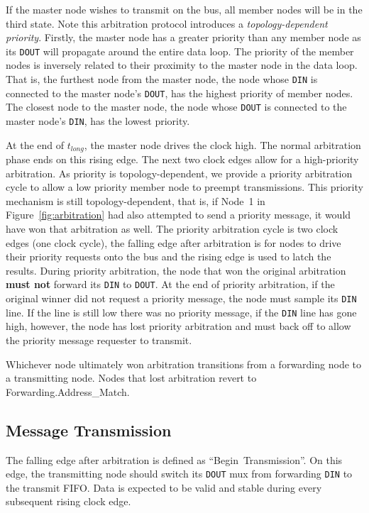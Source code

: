 If the master node wishes to transmit on the bus, all member nodes will be in
the third state. Note this arbitration protocol introduces a {\em
topology-dependent priority}. Firstly, the master node has a greater priority
than any member node as its {\tt DOUT} will propagate around the entire data
loop. The priority of the member nodes is inversely related to their proximity
to the master node in the data loop. That is, the furthest node from the
master node, the node whose {\tt DIN} is connected to the master node's
{\tt DOUT}, has the highest priority of member nodes. The closest node to the
master node, the node whose {\tt DOUT} is connected to the master node's
{\tt DIN}, has the lowest priority.

At the end of $t_{long}$, the master node drives the clock high. The
normal arbitration phase ends on this rising edge. The next two clock edges
allow for a high-priority arbitration. As \bus priority is topology-dependent,
we provide a priority arbitration cycle to allow a low priority member node to
preempt transmissions. This priority mechanism is still topology-dependent,
that is, if Node~1 in Figure~\ref{fig:arbitration} had also attempted to send
a priority message, it would have won that arbitration as well. The priority
arbitration cycle is two clock edges (one clock cycle), the falling edge after
arbitration is for nodes to drive their priority requests onto the bus and the
rising edge is used to latch the results.  During priority arbitration, the
node that won the original arbitration {\bf must not} forward its {\tt DIN} to
{\tt DOUT}. At the end of priority
arbitration, if the original winner did not request a priority message, the
node must sample its {\tt DIN} line. If the line is still low there was no
priority message, if the {\tt DIN} line has gone high, however, the node
has lost priority arbitration and must back off to allow the priority message
requester to transmit.

Whichever node ultimately won arbitration transitions from a forwarding node
to a transmitting node. Nodes that lost arbitration revert to
Forwarding.{\sc Address\_Match}.

\begin{figure}
  \figTimingInterrupt
\end{figure}

\subsection{Message Transmission}
\label{sec:protocol-transmission}
The falling edge after arbitration is defined as ``Begin~Transmission''. On this
edge, the transmitting node should switch its {\tt DOUT} mux from forwarding
{\tt DIN} to the transmit FIFO. Data is expected to be valid and stable during
every subsequent rising clock edge.

